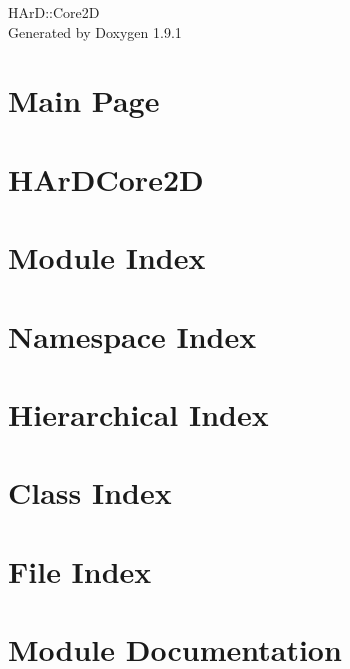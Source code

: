 \let\mypdfximage\pdfximage\def\pdfximage{\immediate\mypdfximage}\documentclass[twoside]{book}
\newcommand{\+}{\discretionary{\mbox{\scriptsize$\hookleftarrow$}}{}{}}
\newcommand{\clearemptydoublepage}{%
  \newpage{\pagestyle{empty}\cleardoublepage}%
}
\begin{document}
\raggedbottom

\hypersetup{pageanchor=false,
             bookmarksnumbered=true,
             pdfencoding=unicode
            }
\begin{titlepage}
\vspace*{7cm}
\begin{center}%
{\Large HArD\+::Core2D }\\
\vspace*{1cm}
{\large Generated by Doxygen 1.9.1}\\
\end{center}
\end{titlepage}
\clearemptydoublepage
{}
\tableofcontents
\clearemptydoublepage
{}
\hypersetup{pageanchor=true}

\chapter{Main Page}
\label{index}\hypertarget{index}{}
\chapter{HAr\+DCore2D}
\label{md_README}

\chapter{Module Index}

\chapter{Namespace Index}

\chapter{Hierarchical Index}

\chapter{Class Index}

\chapter{File Index}

\chapter{Module Documentation}





















\end{document}
